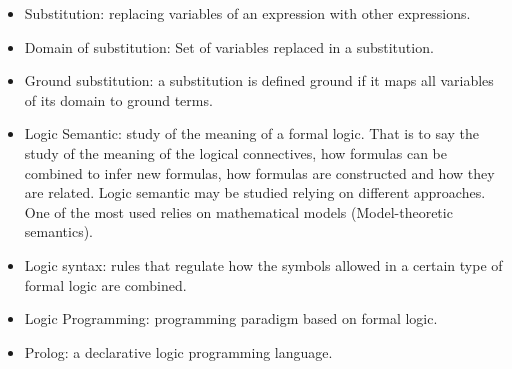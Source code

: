 \begin{itemize}
  \item Substitution: replacing variables of an expression with other expressions.
  \item Domain of substitution: Set of variables replaced in a substitution.
  \item Ground substitution: a substitution is defined ground if it maps all variables 
    of its domain to ground terms. 
  \item Logic Semantic: study of the meaning of a formal logic. That is to say the study
    of the meaning of the logical connectives, how formulas can be combined to infer new formulas,
    how formulas are constructed and how they are related.
    Logic semantic may be studied relying on different approaches. One of the most
    used relies on mathematical models (Model-theoretic semantics).
  \item Logic syntax: rules that regulate how the symbols allowed in a certain type
    of formal logic are combined.
  \item Logic Programming:  programming paradigm based on formal logic.
  \item Prolog: a declarative logic programming language.
\end{itemize}
